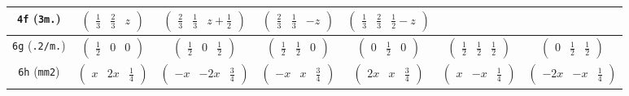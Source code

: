 \documentclass[fleqn,9pt,landscape]{jsarticle}
\begin{document}
\begin{center}
\begin{longtable}{ccccccc}
{\tt 4f} ({\tt 3m.}) & $ \begin{pmatrix} \frac{1}{3} & \frac{2}{3} & z \end{pmatrix} $ & $ \begin{pmatrix} \frac{2}{3} & \frac{1}{3} & z + \frac{1}{2} \end{pmatrix} $ & $ \begin{pmatrix} \frac{2}{3} & \frac{1}{3} & - z \end{pmatrix} $ & $ \begin{pmatrix} \frac{1}{3} & \frac{2}{3} & \frac{1}{2} - z \end{pmatrix} $ & $  $ & $  $ \\ \hline
{\tt 6g} ({\tt .2/m.}) & $ \begin{pmatrix} \frac{1}{2} & 0 & 0 \end{pmatrix} $ & $ \begin{pmatrix} \frac{1}{2} & 0 & \frac{1}{2} \end{pmatrix} $ & $ \begin{pmatrix} \frac{1}{2} & \frac{1}{2} & 0 \end{pmatrix} $ & $ \begin{pmatrix} 0 & \frac{1}{2} & 0 \end{pmatrix} $ & $ \begin{pmatrix} \frac{1}{2} & \frac{1}{2} & \frac{1}{2} \end{pmatrix} $ & $ \begin{pmatrix} 0 & \frac{1}{2} & \frac{1}{2} \end{pmatrix} $ \\ \hline
{\tt 6h} ({\tt mm2}) & $ \begin{pmatrix} x & 2 x & \frac{1}{4} \end{pmatrix} $ & $ \begin{pmatrix} - x & - 2 x & \frac{3}{4} \end{pmatrix} $ & $ \begin{pmatrix} - x & x & \frac{3}{4} \end{pmatrix} $ & $ \begin{pmatrix} 2 x & x & \frac{3}{4} \end{pmatrix} $ & $ \begin{pmatrix} x & - x & \frac{1}{4} \end{pmatrix} $ & $ \begin{pmatrix} - 2 x & - x & \frac{1}{4} \end{pmatrix} $ \\ \hline

\end{longtable}
\end{center}
\end{document}
